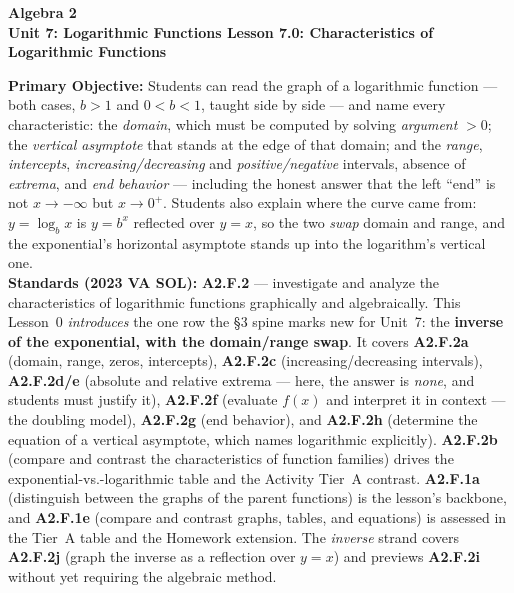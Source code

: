 \documentclass[10pt]{article}
\newcommand{\CourseName}{Algebra 2}
\newcommand{\UnitNumberName}{Unit 7: Logarithmic Functions \quad}
\newcommand{\LessonNumberName}{Lesson 7.0: Characteristics of Logarithmic Functions}
\begin{document}
\begin{center}
    {\Large\bfseries \CourseName \\
    {\small\bfseries \UnitNumberName \LessonNumberName}}
\end{center}

\begin{tcolorbox}[colback=forestbg, colframe=forest, boxrule=0.9pt, arc=2mm,
    left=2mm, right=2mm, top=1.5mm, bottom=1.5mm]
    \textbf{Primary Objective:} Students can read the graph of a logarithmic function --- both cases,
    $b>1$ and $0<b<1$, taught side by side --- and name every characteristic: the \emph{domain},
    which must be computed by solving \emph{argument} $>0$; the \emph{vertical asymptote} that stands
    at the edge of that domain; and the \emph{range}, \emph{intercepts},
    \emph{increasing/decreasing} and \emph{positive/negative} intervals, absence of \emph{extrema},
    and \emph{end behavior} --- including the honest answer that the left ``end'' is not
    $x\to-\infty$ but $x\to 0^{+}$. Students also explain where the curve came from: $y=\log_b x$ is
    $y=b^x$ reflected over $y=x$, so the two \emph{swap} domain and range, and the exponential's
    horizontal asymptote stands up into the logarithm's vertical one.
    \\[2pt]
    \textbf{Standards (2023 VA SOL):} \textbf{A2.F.2} --- investigate and analyze the characteristics
    of logarithmic functions graphically and algebraically. This Lesson~0 \emph{introduces} the one
    row the \S3 spine marks new for Unit~7: the \textbf{inverse of the exponential, with the
    domain/range swap}. It covers \textbf{A2.F.2a} (domain, range, zeros, intercepts),
    \textbf{A2.F.2c} (increasing/decreasing intervals), \textbf{A2.F.2d/e} (absolute and relative
    extrema --- here, the answer is \emph{none}, and students must justify it), \textbf{A2.F.2f}
    (evaluate $f(x)$ and interpret it in context --- the doubling model), \textbf{A2.F.2g} (end
    behavior), and \textbf{A2.F.2h} (determine the equation of a vertical asymptote, which names
    logarithmic explicitly). \textbf{A2.F.2b} (compare and contrast the characteristics of function
    families) drives the exponential-vs.-logarithmic table and the Activity Tier~A contrast.
    \textbf{A2.F.1a} (distinguish between the graphs of the parent functions) is the lesson's
    backbone, and \textbf{A2.F.1e} (compare and contrast graphs, tables, and equations) is assessed
    in the Tier~A table and the Homework extension. The \emph{inverse} strand covers
    \textbf{A2.F.2j} (graph the inverse as a reflection over $y=x$) and previews \textbf{A2.F.2i}
    without yet requiring the algebraic method.
\end{tcolorbox}
\end{document}
